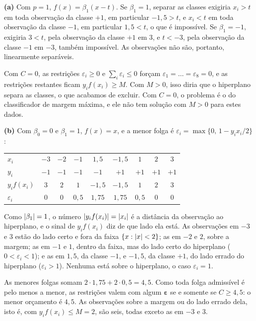 \documentclass[11pt,a4paper]{article}
\begin{document}
\begin{solucao}
\textbf{(a)} Com $p=1$, $f(x)=\beta_1(x-t)$. Se $\beta_1=1$, separar as classes
exigiria $x_i>t$ em toda observação da classe $+1$, em particular $-1{,}5>t$, e
$x_i<t$ em toda observação da classe $-1$, em particular $1{,}5<t$, o que é
impossível. Se $\beta_1=-1$, exigiria $3<t$, pela observação da classe $+1$ em $3$, e
$t<-3$, pela observação da classe $-1$ em $-3$, também impossível. As observações não
são, portanto, linearmente separáveis.

Com $C=0$, as restrições $\varepsilon_i\ge0$ e $\sum_i\varepsilon_i\le0$ forçam
$\varepsilon_1=\dots=\varepsilon_8=0$, e as restrições restantes ficam
$y_if(x_i)\ge M$. Com $M>0$, isso diria que o hiperplano separa as classes, o que
acabamos de excluir. Com $C=0$, o problema é o do classificador de margem máxima, e ele
não tem solução com $M>0$ para estes dados.

\smallskip
\textbf{(b)} Com $\beta_0=0$ e $\beta_1=1$, $f(x)=x$, e a menor folga é
$\varepsilon_i=\max\{0,\,1-y_ix_i/2\}$:
\begin{center}\small
\renewcommand{\arraystretch}{1.3}
\begin{tabular}{@{}lcccccccc@{}}
\toprule
$x_i$ & $-3$ & $-2$ & $-1$ & $1{,}5$ & $-1{,}5$ & $1$ & $2$ & $3$ \\
$y_i$ & $-1$ & $-1$ & $-1$ & $-1$ & $+1$ & $+1$ & $+1$ & $+1$ \\
\midrule
$y_if(x_i)$ & $3$ & $2$ & $1$ & $-1{,}5$ & $-1{,}5$ & $1$ & $2$ & $3$ \\
$\varepsilon_i$ & $0$ & $0$ & $0{,}5$ & $1{,}75$ & $1{,}75$ & $0{,}5$ & $0$ & $0$ \\
\bottomrule
\end{tabular}
\end{center}
Como $\left\lvert \beta_1 \right\rvert=1$, o número $\left\lvert y_if(x_i) \right\rvert=\left\lvert x_i \right\rvert$ é a distância da
observação ao hiperplano, e o sinal de $y_if(x_i)$ diz de que lado ela está. As
observações em $-3$ e $3$ estão do lado certo e fora da faixa $\{x:\left\lvert x \right\rvert<2\}$; as em
$-2$ e $2$, sobre a margem; as em $-1$ e $1$, dentro da faixa, mas do lado certo do
hiperplano ($0<\varepsilon_i<1$); e as em $1{,}5$, da classe $-1$, e $-1{,}5$, da
classe $+1$, do lado errado do hiperplano ($\varepsilon_i>1$). Nenhuma está sobre o
hiperplano, o caso $\varepsilon_i=1$.

As menores folgas somam $2\cdot1{,}75+2\cdot0{,}5=4{,}5$. Como toda folga admissível é
pelo menos a menor, as restrições valem com algum $\bm\varepsilon$ se e somente se
$C\ge4{,}5$: o menor orçamento é $4{,}5$. As observações sobre a margem ou do lado
errado dela, isto é, com $y_if(x_i)\le M=2$, são seis, todas exceto as em $-3$ e $3$.


\end{solucao}
\end{document}

